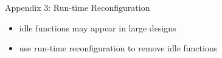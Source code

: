 \begin{frame}{Appendix 3: Run-time Reconfiguration}
  \begin{itemize}
  \item idle functions may appear in large designs
  \item use run-time reconfiguration to remove idle functions
    \begin{columns}
      \begin{column}{.55\textwidth}
  \begin{figure}[!ht]
    \centering
    \def\svgwidth{\linewidth}
    
  \end{figure}
      \end{column}
      \begin{column}{.45\textwidth}
  \begin{figure}[!ht]
    \centering
    \def\svgwidth{\linewidth}
    
  \end{figure}
      \end{column}
    \end{columns}


  \end{itemize}
\end{frame}


